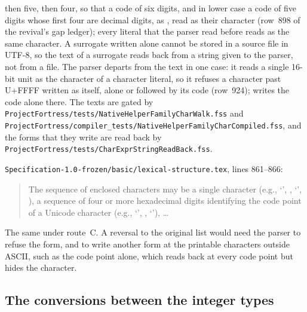 \begin{description}
then five, then four, so that a code of six digits, and in lower case a code of
five digits whose first four are decimal digits, as , read as their
character (row~898 of the revival's gap ledger); every literal that the parser
read before reads as the same character.
A surrogate written alone cannot be stored in a source file in UTF-8, so the
text of a surrogate reads back from a string given to the parser, not from a
file.
The parser departs from the text in one case: it
reads a single 16-bit unit as the character of a character literal, so it
refuses a character past U+FFFF written as itself, alone or followed by its code
(row~924);  writes the code alone there.
The texts are gated by
\nolinkurl{ProjectFortress/tests/NativeHelperFamilyCharWalk.fss} and
\nolinkurl{ProjectFortress/compiler_tests/NativeHelperFamilyCharCompiled.fss},
and the forms that they write are read back by
\nolinkurl{ProjectFortress/tests/CharExprStringReadBack.fss}.
\item[Original text] \nolinkurl{Specification-1.0-frozen/basic/lexical-structure.tex},
lines 861--866:
\begin{quote}
The sequence of enclosed characters may be
a single character
(e.g., `', , `\txt{$\alpha$}', ),
a sequence of four or more hexadecimal digits
identifying the code point of a Unicode character
(e.g., `', , `'), \ldots
\end{quote}
\item[Route C] The same under route~C.
A reversal to the original list would need the parser to refuse the form, and
 to write another form at the printable characters outside
ASCII, such as the code point alone, which reads back at every code point but
hides the character.
\end{description}

\subsection{The conversions between the integer types}

